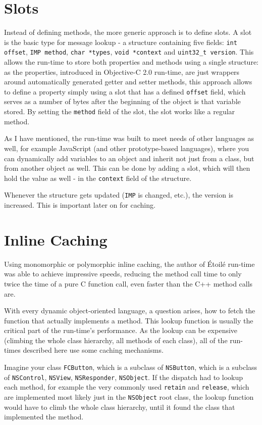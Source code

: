 \section{Slots}
Instead of defining methods, the more generic approach is to define slots. A slot is the basic type for message lookup - a structure containing five fields: \verb=int offset=, \verb=IMP method=, \verb=char *types=, \verb=void *context= and \verb=uint32_t version=. This allows the run-time to store both properties and methods using a single structure: as the properties, introduced in Objective-C 2.0 run-time, are just wrappers around automatically generated getter and setter methods, this approach allows to define a property simply using a slot that has a defined \verb=offset= field, which serves as a number of bytes after the beginning of the object is that variable stored. By setting the \verb=method= field of the slot, the slot works like a regular method.

As I have mentioned, the run-time was built to meet needs of other languages as well, for example JavaScript (and other prototype-based languages), where you can dynamically add variables to an object and inherit not just from a class, but from another object as well. This can be done by adding a slot, which will then hold the value as well - in the \verb=context= field of the structure.

Whenever the structure gets updated (\verb=IMP= is changed, etc.), the version is increased. This is important later on for caching.


\section{Inline Caching}
Using monomorphic or polymorphic inline caching, the author of \'Etoil\'e run-time was able to achieve impressive speeds, reducing the method call time to only twice the time of a pure C function call, even faster than the C++ method calls are.

With every dynamic object-oriented language, a question arises, how to fetch the function that actually implements a method. This lookup function is usually the critical part of the run-time's performance. As the lookup can be expensive (climbing the whole class hierarchy, all methods of each class), all of the run-times described here use some caching mechanisms.

Imagine your class \verb=FCButton=, which is a subclass of \verb=NSButton=, which is a subclass of \verb=NSControl=, \verb=NSView=, \verb=NSResponder=, \verb=NSObject=. If the dispatch had to lookup each method, for example the very commonly used \verb=retain= and \verb=release=, which are implemented most likely just in the \verb=NSObject= root class, the lookup function would have to climb the whole class hierarchy, until it found the class that implemented the method.


